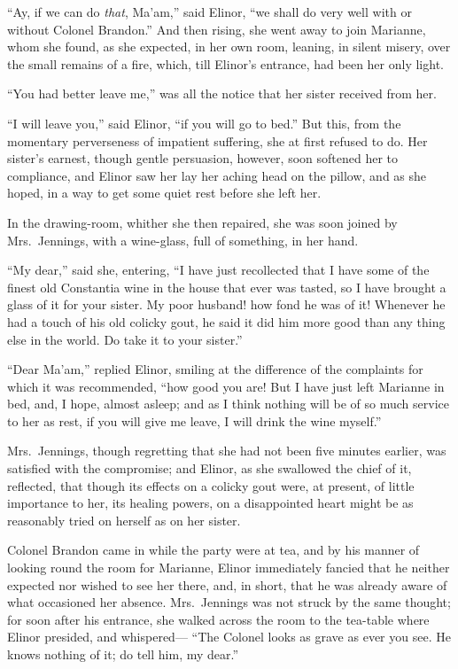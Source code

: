 ``Ay, if we can do \emph{that}, Ma'am,'' said Elinor,
``we shall do very well with or without Colonel Brandon.''
And then rising, she went away to join Marianne,
whom she found, as she expected, in her own room, leaning,
in silent misery, over the small remains of a fire,
which, till Elinor's entrance, had been her only light.

``You had better leave me,'' was all the notice
that her sister received from her.

``I will leave you,'' said Elinor, ``if you will go
to bed.'' But this, from the momentary perverseness
of impatient suffering, she at first refused to do.
Her sister's earnest, though gentle persuasion, however,
soon softened her to compliance, and Elinor saw her
lay her aching head on the pillow, and as she hoped,
in a way to get some quiet rest before she left her.

In the drawing-room, whither she then repaired,
she was soon joined by Mrs.\ Jennings, with a wine-glass,
full of something, in her hand.

``My dear,'' said she, entering, ``I have just recollected
that I have some of the finest old Constantia wine in the
house that ever was tasted, so I have brought a glass of it
for your sister.  My poor husband! how fond he was of it!
Whenever he had a touch of his old colicky gout, he said
it did him more good than any thing else in the world.
Do take it to your sister.''

``Dear Ma'am,'' replied Elinor, smiling at the difference
of the complaints for which it was recommended, ``how good
you are!  But I have just left Marianne in bed, and, I hope,
almost asleep; and as I think nothing will be of so much
service to her as rest, if you will give me leave,
I will drink the wine myself.''

Mrs.\ Jennings, though regretting that she had not been
five minutes earlier, was satisfied with the compromise;
and Elinor, as she swallowed the chief of it, reflected,
that though its effects on a colicky gout were, at present,
of little importance to her, its healing powers,
on a disappointed heart might be as reasonably tried
on herself as on her sister.

Colonel Brandon came in while the party were at tea,
and by his manner of looking round the room for Marianne,
Elinor immediately fancied that he neither expected
nor wished to see her there, and, in short, that he
was already aware of what occasioned her absence.
Mrs.\ Jennings was not struck by the same thought;
for soon after his entrance, she walked across the room
to the tea-table where Elinor presided, and whispered---%
``The Colonel looks as grave as ever you see.  He knows
nothing of it; do tell him, my dear.''

